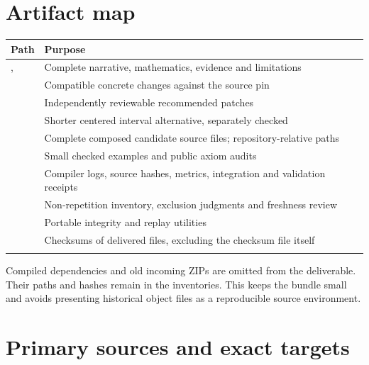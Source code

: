 \documentclass[11pt,a4paper]{article}
\begin{document}
\appendix
\section{Artifact map}

\begin{tabularx}{\textwidth}{@{}L{.34\textwidth}Y@{}}
\toprule
\textbf{Path} & \textbf{Purpose}\\
\midrule
{},  & Complete narrative, mathematics, evidence and limitations\\
\addlinespace[3pt]
 & Compatible concrete changes against the source pin\\
\addlinespace[3pt]
 & Independently reviewable recommended patches\\
\addlinespace[3pt]
 & Shorter centered interval alternative, separately checked\\
\addlinespace[3pt]
 & Complete composed candidate source files; repository-relative paths\\
\addlinespace[3pt]
 & Small checked examples and public axiom audits\\
\addlinespace[3pt]
 & Compiler logs, source hashes, metrics, integration and validation receipts\\
\addlinespace[3pt]
 & Non-repetition inventory, exclusion judgments and freshness review\\
\addlinespace[3pt]
 & Portable integrity and replay utilities\\
\addlinespace[3pt]
 & Checksums of delivered files, excluding the checksum file itself\\
\addlinespace[3pt]
\bottomrule
\end{tabularx}

Compiled dependencies and old incoming ZIPs are omitted from the deliverable. Their paths and hashes remain in the inventories. This keeps the bundle small and avoids presenting historical object files as a reproducible source environment.

\newpage
\section{Primary sources and exact targets}
\end{document}
